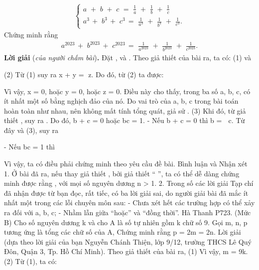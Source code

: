 \begin{multicols}{2}
{	\begin{align*}
		\begin{cases}
			a\,\, + \,\,b\,\, + \,\,c\,\, = \,\,\frac{1}{a}\,\, + \,\,\frac{1}{b}\,\, + \,\,\frac{1}{c}\\
			{a^3}\, + \,\,{b^3}\, + \,\,{c^3}\, = \,\,\frac{1}{{{a^3}}}\,\, + \,\,\frac{1}{{{b^3}}}\,\, + \,\,\frac{1}{{{c^3}}}.
		\end{cases}
	\end{align*}
	Chứng minh rằng
	\begin{align*}
		{a^{2023}}\, + \,\,{b^{2023}}\, + \,\,{c^{2023}}\, = \,\,\frac{1}{{{a^{2023}}}}\,\, + \,\,\frac{1}{{{b^{2023}}}}\,\, + \,\,\frac{1}{{{c^{2023}}}}.
	\end{align*}
	\textbf{Lời giải} (\textit{của người chấm bài})\textbf{.}
	\vskip 0.05cm
	Đặt ,   và  .
	Theo giả thiết của bài ra, ta có:
	(1)
	và
	
	(2)
	Từ (1) suy ra x + y = z. Do đó, từ (2) ta được:
	
	Vì vậy, x = 0, hoặc y = 0, hoặc z = 0. Điều này cho thấy, trong ba số a, b, c, có ít nhất một số bằng nghịch đảo của nó.
	Do vai trò của a, b, c trong bài toán hoàn toàn như nhau, nên không mất tính tổng quát, giả sử
	.                                                                          (3)
	Khi đó, từ giả thiết
	,
	suy ra
	.
	Do đó, b + c = 0 hoặc bc = 1.
	- Nếu b + c = 0 thì b =  c. Từ đây và (3), suy ra
	
	- Nếu bc = 1 thì
	
	Vì vậy, ta có điều phải chứng minh theo yêu cầu đề bài.
	Bình luận và Nhận xét
	1. Ở bài đã ra, nếu thay giả thiết
	,
	bởi giả thiết “ ”, ta có thể dễ dàng chứng minh được rằng
	,
	với mọi số nguyên dương n > 1.
	2. Trong số các lời giải Tạp chí đã nhận được từ bạn đọc, rất tiếc, có ba lời giải sai, do người giải bài đã mắc ít nhất một trong các lỗi chuyên môn sau:
	- Chưa xét hết các trường hợp có thể xảy ra đối với a, b, c;
	- Nhầm lẫn giữa “hoặc” và “đồng thời”.
	Hà Thanh
	P723. (Mức B) Cho số nguyên dương k và cho A là số tự nhiên gồm k chữ số 9. Gọi m, n, p tương ứng là tổng các chữ số của A,     Chứng minh rằng p = 2m = 2n.
	Lời giải (dựa theo lời giải của bạn Nguyễn Chánh Thiện, lớp 9/12, trường THCS Lê Quý Đôn, Quận 3, Tp. Hồ Chí Minh).
	Theo giả thiết của bài ra,                                                                                                     (1)
	Vì vậy, m = 9k.                                                                                                                                        (2)
	Từ (1), ta có:
	
}
\end{multicols}
